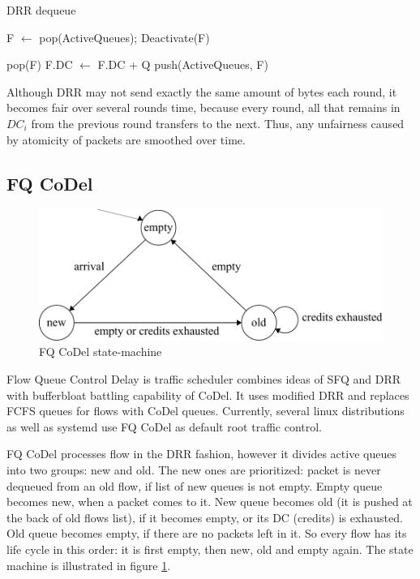 \begin{algorithm}
	\caption{DRR dequeue}
	\label{alg01:DRR_deq}
	\begin{algorithmic}
			\State F $\leftarrow$ pop(ActiveQueues);
				\State Deactivate(F)
				
					\State \Return pop(F)
			\Else {}
				\State F.DC $\leftarrow$ F.DC + Q
				\State push(ActiveQueues, F)
			\EndIf
		\EndWhile
	\end{algorithmic}
\end{algorithm}
Although DRR may not send exactly the same amount of bytes each round, it becomes fair  over several rounds time, because every round,  all that remains in $DC_i$ from the previous round transfers to the next. Thus, any unfairness caused by atomicity of packets are smoothed over time.


\subsection{FQ CoDel}

\begin{figure}
	\centering
	\includegraphics[width=137mm]{drawings/fq_codel}
	\caption{FQ CoDel state-machine}
	
	\label{fig06:fqcodel}
\end{figure}


Flow Queue Control Delay \cite{fq_codel} is traffic scheduler combines ideas of SFQ and DRR with bufferbloat battling capability of CoDel. It uses modified DRR and replaces FCFS queues for flows with CoDel queues. Currently, several linux distributions as well as systemd use FQ CoDel as default root traffic control.

FQ CoDel processes flow in the DRR fashion, however it divides active queues into two groups: new and old. The new ones are prioritized: packet is never dequeued from an old flow, if list of new queues is not empty. Empty queue becomes new, when a packet comes to it. New queue becomes old (it is pushed at the back of old flows list), if it becomes empty, or its DC (credits) is exhausted. Old queue becomes empty, if there are no packets left in it. So every flow has its life cycle in this order: it is first empty, then new, old and empty again. The state machine is illustrated in figure \ref{fig06:fqcodel}.

